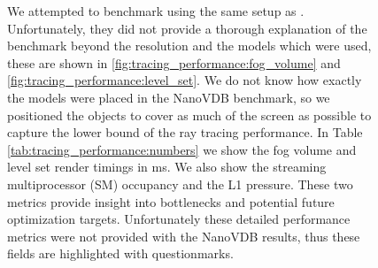 \begin{figure}[H]
{\begin{tabularx}{\textwidth}{|c|X|X|X|X|X|X|}
            \hline
        \end{tabularx}
        \label{tab:tracing_performance:numbers}
    }
    \caption{We attempted to benchmark using the same setup as \cite{NanoVDBBenchmark}. Unfortunately, they did not provide a thorough explanation of the benchmark beyond the resolution and the models which were used, these are shown in \ref{fig:tracing_performance:fog_volume} and \ref{fig:tracing_performance:level_set}. We do not know how exactly the models were placed in the NanoVDB benchmark, so we positioned the objects to cover as much of the screen as possible to capture the lower bound of the ray tracing performance. In Table \ref{tab:tracing_performance:numbers} we show the fog volume and level set render timings in ms. We also show the streaming multiprocessor (SM) occupancy and the L1 pressure. These two metrics provide insight into bottlenecks and potential future optimization targets. Unfortunately these detailed performance metrics were not provided with the NanoVDB results, thus these fields are highlighted with questionmarks.}
    \label{tab:tracing_performance}
\end{figure}